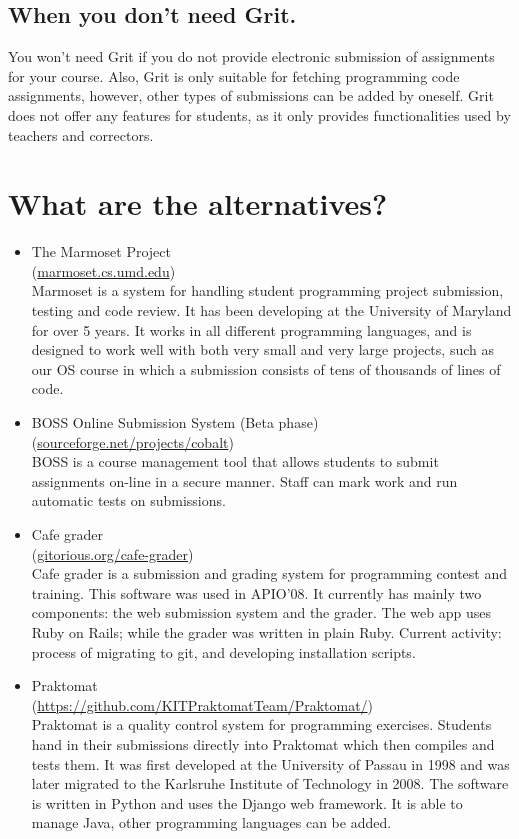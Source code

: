 \documentclass[10pt,a4paper, titlepage, toc=idx]{scrreprt}
\theoremstyle{definition}
\theoremstyle{plain}
\newcommand*{\product}{Grit}
\begin{document}
\subsection*{When you don't need \product.}
You won't need \product{} if you do not provide electronic submission of
assignments for your course. Also, \product{} is only suitable for
fetching programming code assignments, however, other types of
submissions can be added by oneself.  \product{} does not offer any
features for students, as it only provides functionalities used by
teachers and correctors.
\section{What are the alternatives?}
\begin{itemize}
\item The Marmoset Project \\
  (\url{marmoset.cs.umd.edu}) \\
  Marmoset is a system for handling student programming project
  submission, testing and code review. It has been developing at the
  University of Maryland for over 5 years. It works in all different
  programming languages, and is designed to work well with both very
  small and very large projects, such as our OS course in which a
  submission consists of tens of thousands of lines of code.
\item BOSS Online Submission System (Beta phase) \\
  (\url{sourceforge.net/projects/cobalt}) \\
  BOSS is a course management tool that allows students to submit
  assignments on-line in a secure manner. Staff can mark work and run
  automatic tests on submissions.
\item Cafe grader \\
  (\url{gitorious.org/cafe-grader}) \\
  Cafe grader is a submission and grading system for programming
  contest and training.  This software was used in APIO'08. It
  currently has mainly two components: the web submission system and
  the grader. The web app uses Ruby on Rails; while the grader was
  written in plain Ruby. Current activity: process of migrating to
  git, and developing installation scripts.
\item Praktomat \\
  (\url{https://github.com/KITPraktomatTeam/Praktomat/})
  \\
  Praktomat is a quality control system for programming
  exercises. Students hand in their submissions directly into
  Praktomat which then compiles and tests them. It was first developed
  at the University of Passau in 1998 and was later migrated to the
  Karlsruhe Institute of Technology in 2008.  The software is written
  in Python and uses the Django web framework. It is able to manage
  Java, other programming languages can be added.
\end{itemize}
\end{document}
